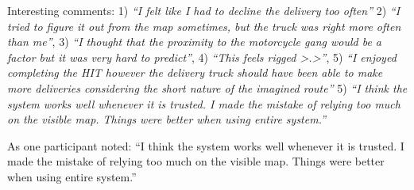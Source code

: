 Interesting comments: 1) \emph{``I felt like I had to decline the delivery too often''} 2) \emph{``I tried to figure it out from the map sometimes, but the truck was right more often than me''}, 3) \emph{``I thought that the proximity to the motorcycle gang would be a factor but it was very hard to predict''}, 4) \emph{``This feels rigged >.>''}, 5) \emph{``I enjoyed completing the HIT however the delivery truck should have been able to make more deliveries considering the short nature of the imagined route''} 5) \emph{``I think the system works well whenever it is trusted. I made the mistake of relying too much on the visible map. Things were better when using entire system.''}

As one participant noted: ``I think the system works well whenever it is trusted. I made the mistake of relying too much on the visible map. Things were better when using entire system.''
